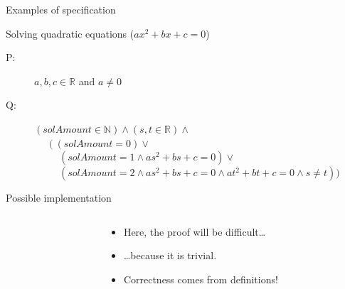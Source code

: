 \begin{frame}{Examples of specification}

  \begin{block}{Solving quadratic equations ($ax^2+bx+c=0$)}
    \begin{description}
    \item[P:] $a,b,c \in\mathbb{R}$ and $a\neq 0$
    \item[Q:] $(solAmount\in\mathbb{N}) \wedge (s,t \in\mathbb{R}) \wedge$\\
      ~~~$(~(solAmount = 0) \vee$\\
      ~~~~~$(solAmount = 1 \wedge as^2+bs+c=0) \vee$\\
      ~~~~~$(solAmount = 2 \wedge as^2+bs+c=0 \wedge at^2+bt+c=0 \wedge s\neq t)
      )$     
    \end{description}
  \end{block}

  \begin{block}{Possible implementation}
    
  \end{block}
  \begin{columns}
    \begin{column}{.4\linewidth}
    \end{column}

    \begin{column}{.5\linewidth}
      \begin{itemize}
      \item Here, the proof will be difficult\ldots
      \item \ldots because it is trivial.
      \item Correctness comes from definitions!
      \end{itemize}
    \end{column}
  \end{columns}
\end{frame}

